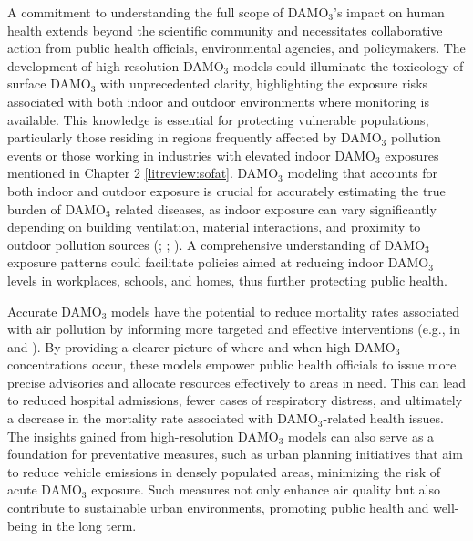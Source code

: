 A commitment to understanding the full scope of DAMO$_3$’s impact on human health extends beyond the scientific community and necessitates collaborative action from public health officials, environmental agencies, and policymakers. The development of high-resolution DAMO$_3$ models could illuminate the toxicology of surface DAMO$_3$ with unprecedented clarity, highlighting the exposure risks associated with both indoor and outdoor environments where monitoring is available. This knowledge is essential for protecting vulnerable populations, particularly those residing in regions frequently affected by DAMO$_3$ pollution events or those working in industries with elevated indoor DAMO$_3$ exposures mentioned in Chapter 2 \ref{litreview:sofat}. DAMO$_3$ modeling that accounts for both indoor and outdoor exposure is crucial for accurately estimating the true burden of DAMO$_3$ related diseases, as indoor exposure can vary significantly depending on building ventilation, material interactions, and proximity to outdoor pollution sources (\cite{jadoon_health_2022}; \cite{barzeghar_long-term_2020}; \cite{hwang_indoor_2020}). A comprehensive understanding of DAMO$_3$ exposure patterns could facilitate policies aimed at reducing indoor DAMO$_3$ levels in workplaces, schools, and homes, thus further protecting public health.

Accurate DAMO$_3$ models have the potential to reduce mortality rates associated with air pollution by informing more targeted and effective interventions (e.g., in \cite{li_spatiotemporal_2024} and \cite{rovira_air_2020}). By providing a clearer picture of where and when high DAMO$_3$ concentrations occur, these models empower public health officials to issue more precise advisories and allocate resources effectively to areas in need. This can lead to reduced hospital admissions, fewer cases of respiratory distress, and ultimately a decrease in the mortality rate associated with DAMO$_3$-related health issues. The insights gained from high-resolution DAMO$_3$ models can also serve as a foundation for preventative measures, such as urban planning initiatives that aim to reduce vehicle emissions in densely populated areas, minimizing the risk of acute DAMO$_3$ exposure. Such measures not only enhance air quality but also contribute to sustainable urban environments, promoting public health and well-being in the long term.
